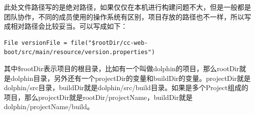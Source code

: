 \documentclass[letter]{book}
\begin{document}
此处文件路径写的是绝对路径，如果仅仅在本机进行构建问题不大，但是一般都是团队协作，不同的成员使用的操作系统有区别，项目存放的路径也不一样，所以写成相对路径会比较妥当。可以写成如下：

\begin{lstlisting}
File versionFile = file("$rootDir/cc-web-boot/src/main/resource/version.properties")
\end{lstlisting}

其中\$rootDir表示项目的根目录，比如有一个叫做dolphin的项目，那么rootDir就是dolphin目录，另外还有一个projectDir的变量和buildDir的变量。projectDir就是dolphin/src目录，buildDir就是dolphin/src/build目录。如果是多个Project组成的项目，那么projectDir就是rootDir/projectName，buildDir就是dolphin/projectName/build。
\end{document}
